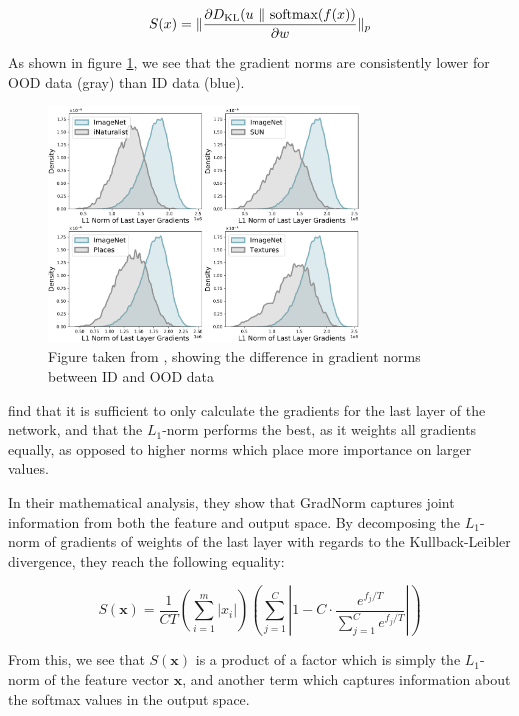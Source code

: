 \documentclass[UKenglish]{uiomasterthesis} %
\theoremstyle{definition}
\begin{document}
\begin{equation}
\label{eq:score}
    S(\*x) = \lVert\frac{\partial D_\text{KL}(\*u~\lVert~\text{softmax}(f(\*x))}{\partial \*w}  \rVert_p
\end{equation}

As shown in figure \ref{gradnorms}, we see that the gradient norms are consistently lower for OOD data (gray) than ID data (blue).

\begin{figure}[h]
\centerline{\includegraphics[width=3.25in]{figure/gradnorm.pdf}}
\caption{Figure taken from \cite{gradnorm}, showing the difference in gradient norms between ID and OOD data}
\label{gradnorms}
\end{figure}

\cite{gradnorm} find that it is sufficient to only calculate the gradients for the last layer of the network, and that the $L_1$-norm performs the best, as it weights all gradients equally, as opposed to higher norms which place more importance on larger values.

In their mathematical analysis, they show that GradNorm captures joint information from both the feature and output space. By decomposing the $L_1$-norm of gradients of weights of the last layer with regards to the Kullback-Leibler divergence, they reach the following equality:

\begin{equation}
S(\bm{x}) = \frac{1}{CT}  \left(\sum_{i=1}^m |x_i|\right) \left(\sum_{j=1}^C \left|1 - C \cdot \frac{e^{f_j / T}}{\sum_{j=1}^C e^{{f_{j}} / T}}\right|\right)
\label{eq:decomp}
\end{equation}

From this, we see that $S(\bm{x})$ is a product of a factor which is simply the $L_1$-norm of the feature vector $\bm{x}$, and another term which captures information about the softmax values in the output space.
\\
\end{document}
